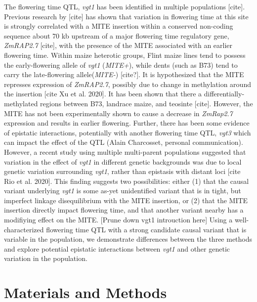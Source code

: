 \documentclass[article,9pt,twocolumn,twoside]{rilabRxiv}
\begin{document}
The flowering time QTL, \emph{vgt1} has been identified in multiple populations [cite].
Previous research by [cite] has shown that variation in flowering time at this site is strongly correlated with a MITE insertion within a conserved non-coding sequence about 70 kb upstream of a major flowering time regulatory gene, \emph{ZmRAP2.7} [cite], with the presence of the MITE associated with an earlier flowering time.
Within maize heterotic groups, Flint maize lines tend to possess the early-flowering allele of \emph{vgt1} (\emph{MITE+}), while dents (such as B73) tend to carry the late-flowering allele(\emph{MITE-}) [cite?].
It is hypothesized that the MITE represses expression of \emph{ZmRAP2.7}, possibly due to change in methylation around the insertion [cite Xu et al. 2020]. It has been shown that there a differentially-methylated regions between B73, landrace maize, and teosinte [cite].
However, the MITE has not been experimentally shown to cause a decrease in \emph{ZmRap2.7} expression and results in earlier flowering. Further, there has been some evidence of epistatic interactions, potentially with another flowering time QTL, \emph{vgt3} which can impact the effect of the QTL (Alain Charcosset, personal communication).
However, a recent study using multiple multi-parent populations suggested that variation in the effect of \emph{vgt1} in different genetic backgrounds was due to local genetic variation surrounding \emph{vgt1}, rather than epistasis with distant loci [cite Rio et al. 2020].
This finding suggests two possibilities: either (1) that the causal variant underlying \emph{vgt1} is some as-yet unidentified variant that is in tight, but imperfect linkage disequilibrium with the MITE insertion, or (2) that the MITE insertion directly impact flowering time, and that another variant nearby has a modifiying effect on the MITE.
[Prune down vgt1 introuction here]
Using a well-characterized flowering time QTL with a strong candidate causal variant that is variable in the population, we demonstrate differences between the three methods and explore potential epistatic interactions between \emph{vgt1} and other genetic variation in the population.
\section{Materials and Methods}
\label{sec:materials:methods}
\end{document}
